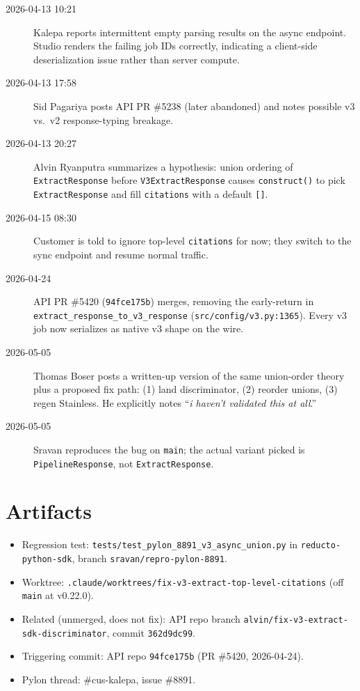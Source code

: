 \documentclass[11pt]{article}
\begin{document}
\begin{description}
  \item[2026-04-13 10:21] Kalepa reports intermittent empty parsing results on the async endpoint. Studio renders the failing job IDs correctly, indicating a client-side deserialization issue rather than server compute.
  \item[2026-04-13 17:58] Sid Pagariya posts API PR \#5238 (later abandoned) and notes possible v3 vs.\ v2 response-typing breakage.
  \item[2026-04-13 20:27] Alvin Ryanputra summarizes a hypothesis: union ordering of \texttt{ExtractResponse} before \texttt{V3ExtractResponse} causes \texttt{construct()} to pick \texttt{ExtractResponse} and fill \texttt{citations} with a default \texttt{[]}.
  \item[2026-04-15 08:30] Customer is told to ignore top-level \texttt{citations} for now; they switch to the sync endpoint and resume normal traffic.
  \item[2026-04-24] API PR \#5420 (\texttt{94fce175b}) merges, removing the early-return in \texttt{extract\_response\_to\_v3\_response} (\texttt{src/config/v3.py:1365}). Every v3 job now serializes as native v3 shape on the wire.
  \item[2026-05-05] Thomas Boser posts a written-up version of the same union-order theory plus a proposed fix path: (1) land discriminator, (2) reorder unions, (3) regen Stainless. He explicitly notes ``\emph{i haven't validated this at all}.''
  \item[2026-05-05] Sravan reproduces the bug on \texttt{main}; the actual variant picked is \texttt{PipelineResponse}, not \texttt{ExtractResponse}.
\end{description}

\section{Artifacts}

\begin{itemize}
  \item Regression test: \texttt{tests/test\_pylon\_8891\_v3\_async\_union.py} in \texttt{reducto-python-sdk}, branch \texttt{sravan/repro-pylon-8891}.
  \item Worktree: \texttt{.claude/worktrees/fix-v3-extract-top-level-citations} (off \texttt{main} at v0.22.0).
  \item Related (unmerged, does not fix): API repo branch \texttt{alvin/fix-v3-extract-sdk-discriminator}, commit \texttt{362d9dc99}.
  \item Triggering commit: API repo \texttt{94fce175b} (PR \#5420, 2026-04-24).
  \item Pylon thread: \#cus-kalepa, issue \#8891.
\end{itemize}
\end{document}
